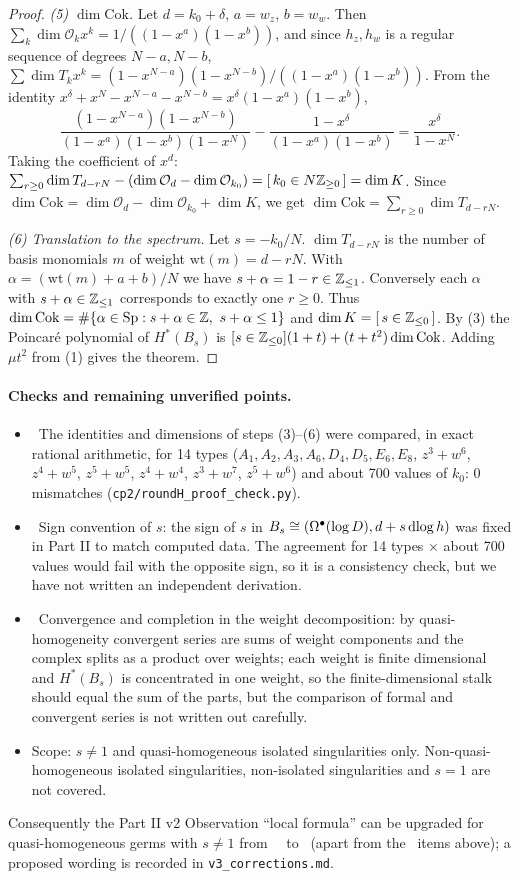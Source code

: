 \begin{proof}
\emph{(5) $\dim\mathrm{Cok}$.} Let $d=k_0+\delta$, $a=w_z$, $b=w_w$. Then $\sum_k\dim\mathcal O_kx^k=1/((1-x^a)(1-x^b))$, and since $h_z,h_w$ is a regular sequence of degrees $N-a,N-b$, $\sum\dim T_kx^k=(1-x^{N-a})(1-x^{N-b})/((1-x^a)(1-x^b))$. From the identity $x^\delta+x^N-x^{N-a}-x^{N-b}=x^\delta(1-x^a)(1-x^b)$,
\[\frac{(1-x^{N-a})(1-x^{N-b})}{(1-x^a)(1-x^b)(1-x^N)}-\frac{1-x^\delta}{(1-x^a)(1-x^b)}=\frac{x^\delta}{1-x^N}.\]
Taking the coefficient of $x^d$: $\sum_{r\ge0}\dim T_{d-rN}-(\dim\mathcal O_d-\dim\mathcal O_{k_0})=[\,k_0\in N\mathbb Z_{\ge0}\,]=\dim K$. Since $\dim\mathrm{Cok}=\dim\mathcal O_d-\dim\mathcal O_{k_0}+\dim K$, we get $\dim\mathrm{Cok}=\sum_{r\ge0}\dim T_{d-rN}$.

\emph{(6) Translation to the spectrum.} Let $s=-k_0/N$. $\dim T_{d-rN}$ is the number of basis monomials $m$ of weight $\mathrm{wt}(m)=d-rN$. With $\alpha=(\mathrm{wt}(m)+a+b)/N$ we have $s+\alpha=1-r\in\mathbb Z_{\le1}$. Conversely each $\alpha$ with $s+\alpha\in\mathbb Z_{\le1}$ corresponds to exactly one $r\ge0$. Thus $\dim\mathrm{Cok}=\#\{\alpha\in\mathrm{Sp}:s+\alpha\in\Z,\ s+\alpha\le1\}$ and $\dim K=[\,s\in\mathbb Z_{\le0}\,]$. By (3) the Poincar\'e polynomial of $H^*(B_s)$ is $[s\in\mathbb Z_{\le0}](1+t)+(t+t^2)\dim\mathrm{Cok}$. Adding $\mu t^2$ from (1) gives the theorem.
\end{proof}
\paragraph{Checks and remaining unverified points.}
\begin{itemize}
\item \tV\ The identities and dimensions of steps (3)--(6) were compared, in exact rational arithmetic, for 14 types ($A_1,A_2,A_3,A_6,D_4,D_5,E_6,E_8$, $z^3+w^6$, $z^4+w^5$, $z^5+w^5$, $z^4+w^4$, $z^3+w^7$, $z^5+w^6$) and about 700 values of $k_0$: 0 mismatches (\texttt{cp2/roundH\_proof\_check.py}).
\item \tQ\ Sign convention of $s$: the sign of $s$ in $B_s\cong(\Omega^\bullet(\log D),d+s\,\mathrm{dlog}\, h)$ was fixed in Part II to match computed data. The agreement for 14 types $\times$ about 700 values would fail with the opposite sign, so it is a consistency check, but we have not written an independent derivation.
\item \tQ\ Convergence and completion in the weight decomposition: by quasi-homogeneity convergent series are sums of weight components and the complex splits as a product over weights; each weight is finite dimensional and $H^*(B_s)$ is concentrated in one weight, so the finite-dimensional stalk should equal the sum of the parts, but the comparison of formal and convergent series is not written out carefully.
\item Scope: $s\ne1$ and quasi-homogeneous isolated singularities only. Non-quasi-homogeneous isolated singularities, non-isolated singularities and $s=1$ are not covered.
\end{itemize}
Consequently the Part II v2 Observation ``local formula'' can be upgraded for quasi-homogeneous germs with $s\ne1$ from \tV\ \tK\ to \tP\ (apart from the \tQ\ items above); a proposed wording is recorded in \texttt{v3\_corrections.md}.

